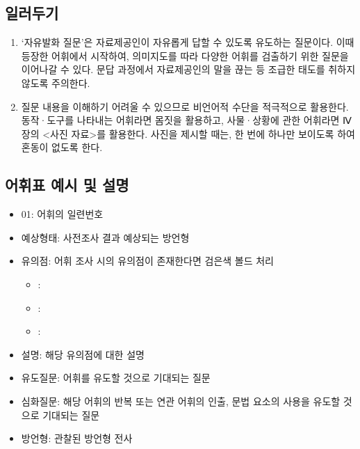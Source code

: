 \documentclass{snu-fl-questionnaire}
\begin{document}
\subsection{일러두기}
\begin{enumerate}[noitemsep]
  \item `자유발화 질문'은 자료제공인이 자유롭게 답할 수 있도록 유도하는 질문이다. 이때 등장한 어휘에서 시작하여, 의미지도를 따라 다양한 어휘를 검출하기 위한 질문을 이어나갈 수 있다. 문답 과정에서 자료제공인의 말을 끊는 등 조급한 태도를 취하지 않도록 주의한다.
  \item 질문 내용을 이해하기 어려울 수 있으므로 비언어적 수단을 적극적으로 활용한다. 동작·도구를 나타내는 어휘라면 몸짓을 활용하고, 사물·상황에 관한 어휘라면 Ⅳ장의 <사진 자료>를 활용한다. 사진을 제시할 때는, 한 번에 하나만 보이도록 하여 혼동이 없도록 한다.
\end{enumerate} 

\subsection{어휘표 예시 및 설명}

\begin{itemize}[noitemsep]
  \item 01: 어휘의 일련번호
  \item 예상형태: 사전조사 결과 예상되는 방언형
  \item 유의점: 어휘 조사 시의 유의점이 존재한다면 검은색 볼드 처리
  \begin{itemize}[noitemsep]
    \item \sffamily{\textbf{[MS]}}: 
    \item \sffamily{\textbf{[SP]}}: 
    \item \sffamily{\textbf{[DP]}}: 
  \end{itemize}
  \item 설명: 해당 유의점에 대한 설명
  \item 유도질문: 어휘를 유도할 것으로 기대되는 질문
  \item 심화질문: 해당 어휘의 반복 또는 연관 어휘의 인출, 문법 요소의 사용을 유도할 것으로 기대되는 질문
  \item 방언형: 관찰된 방언형 전사
\end{itemize}
\end{document}
